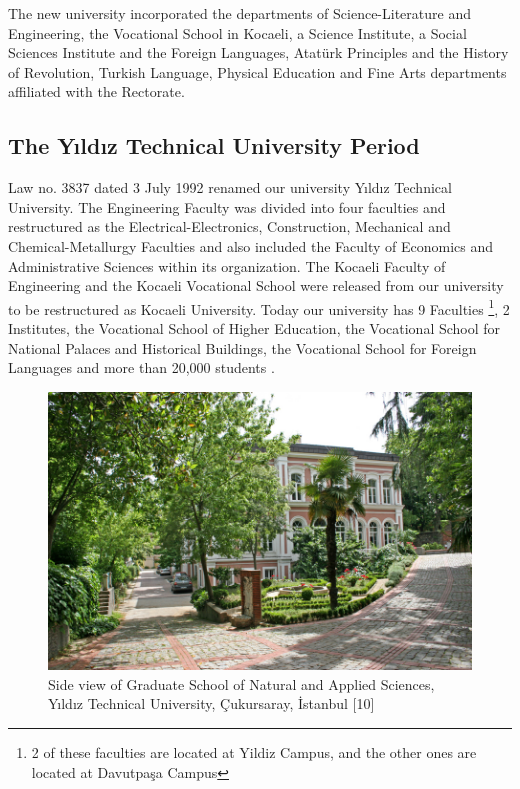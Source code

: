The new university incorporated the departments of Science-Literature and Engineering, the Vocational School in Kocaeli, a Science Institute, a Social Sciences Institute and the Foreign Languages, Atatürk Principles and the History of Revolution, Turkish Language, Physical Education and Fine Arts departments affiliated with the Rectorate.

\subsection{The Yıldız Technical University Period}
Law no. 3837 dated 3 July 1992 renamed our university Yıldız Technical University. The Engineering Faculty was divided into four faculties and restructured as the Electrical-Electronics, Construction, Mechanical and Chemical-Metallurgy Faculties and also included the Faculty of Economics and Administrative Sciences within its organization. The Kocaeli Faculty of Engineering and the Kocaeli Vocational School were released from our university to be restructured as Kocaeli University. Today our university has 9 Faculties \footnote{2 of these faculties are located at Yildiz Campus, and the other ones are located at Davutpaşa Campus}, 2 Institutes, the Vocational School of Higher Education, the Vocational School for National Palaces and Historical Buildings, the Vocational School for Foreign Languages and more than 20,000 students . 

\begin{figure}[htbp]
\centering
\includegraphics[width=\textwidth]{thesisChapters/images/Picture3}
\caption{Side view of Graduate School of Natural and Applied Sciences, Yıldız Technical University, Çukursaray, İstanbul [10]}
\end{figure}

